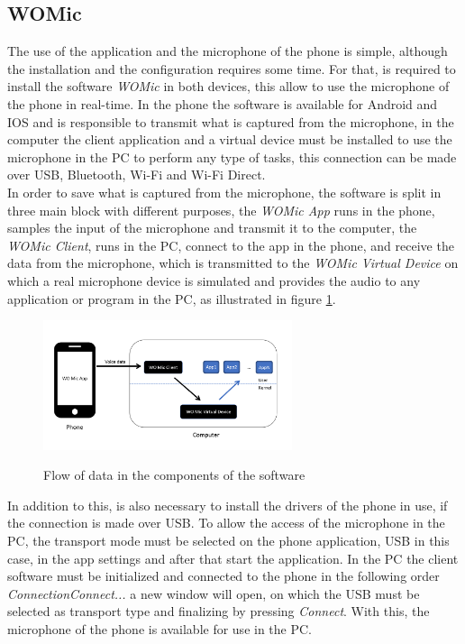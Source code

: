 \subsection*{WOMic}
The use of the application and the microphone of the phone is simple, although the installation and the configuration requires some time. For that, is required to install the software \textit{WOMic} in both devices, this allow to use the microphone of the phone in real-time. In the phone the software is available for Android and IOS and is responsible to transmit what is captured from the microphone, in the computer the client application and a virtual device must be installed to use the microphone in the PC to perform any type of tasks, this connection can be made over USB, Bluetooth, Wi-Fi and Wi-Fi Direct.\\ 
In order to save what is captured from the microphone, the software is split in three main block with different purposes, the \textit{WOMic App} runs in the phone, samples the input of the microphone and transmit it to the computer, the \textit{WOMic Client}, runs in the PC, connect to the app in the phone, and receive the data from the microphone, which is transmitted to the \textit{WOMic Virtual Device} on which a real microphone device is simulated and provides the audio to any application or program in the PC, as illustrated in figure \ref{fig:diagramWOMIC}.\\
\begin{figure}[!htb]
    \centering
    \includegraphics[width=0.65\textwidth]{Chapters/5CHP/Images/WOMICDiag.png}
    \caption{Flow of data in the components of the software}{\cite{WOMicFREE}}
    \label{fig:diagramWOMIC}
\end{figure}
In addition to this, is also necessary to install the drivers of the phone in use, if the connection is made over USB. To allow the access of the microphone in the PC, the transport mode must be selected on the phone application, USB in this case, in the app settings and after that start the application. In the PC the client software must be initialized and connected to the phone in the following order \textit{\>Connection\>Connect...} a new window will open, on which the USB must be selected as transport type and finalizing by pressing \textit{Connect}. With this, the microphone of the phone is available for use in the PC\cite{WOMicFREE}.
